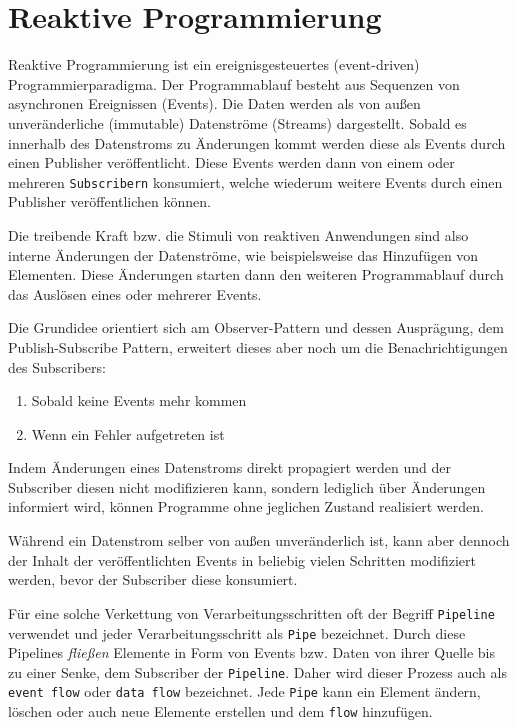 \section{Reaktive Programmierung}
\label{section:reaktive_programmierung}
Reaktive Programmierung ist ein ereignisgesteuertes (event-driven) Programmierparadigma.
Der Programmablauf besteht aus Sequenzen von asynchronen Ereignissen (Events).
Die Daten werden als von außen unveränderliche (immutable) Datenströme (Streams) dargestellt.
Sobald es innerhalb des Datenstroms zu Änderungen kommt werden diese als Events durch einen Publisher veröffentlicht.
Diese Events werden dann von einem oder mehreren \verb|Subscribern| konsumiert, welche wiederum weitere Events durch einen
Publisher veröffentlichen können.

Die treibende Kraft bzw. die Stimuli von reaktiven Anwendungen sind also interne Änderungen der Datenströme, wie beispielsweise das
Hinzufügen von Elementen.
Diese Änderungen starten dann den weiteren Programmablauf durch das Auslösen eines oder mehrerer Events.

Die Grundidee orientiert sich am Observer-Pattern und dessen Ausprägung, dem Publish-Subscribe Pattern, erweitert dieses aber
noch um die Benachrichtigungen des Subscribers:
\begin{enumerate}
  \item Sobald keine Events mehr kommen
  \item Wenn ein Fehler aufgetreten ist
\end{enumerate}
Indem Änderungen eines Datenstroms direkt propagiert werden und der Subscriber diesen nicht modifizieren kann, sondern lediglich über Änderungen informiert wird,
können Programme ohne jeglichen Zustand realisiert werden\parencite{Escoffier2017}.

Während ein Datenstrom selber von außen unveränderlich ist, kann aber dennoch der Inhalt
der veröffentlichten Events in beliebig vielen Schritten modifiziert werden, bevor der Subscriber diese konsumiert.

Für eine solche Verkettung von Verarbeitungsschritten oft der Begriff \verb|Pipeline| verwendet und jeder Verarbeitungsschritt als \verb|Pipe| bezeichnet.
Durch diese Pipelines \textit{fließen} Elemente in Form von Events bzw. Daten von ihrer Quelle
bis zu einer Senke, dem Subscriber der \verb|Pipeline|.
Daher wird dieser Prozess auch als \verb|event flow| oder \verb|data flow| bezeichnet.
Jede \verb|Pipe| kann ein Element ändern, löschen oder auch neue Elemente erstellen und dem \verb|flow| hinzufügen.


